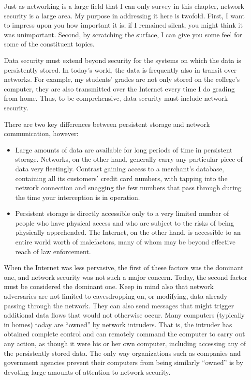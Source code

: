 Just as networking is a large field that I can only survey in this chapter, network
security is a large area.  My purpose in addressing it here is
twofold.  First, I want to impress upon you how important it is; if I
remained silent, you might think it was unimportant.  Second, by
scratching the surface, I can give you some feel for some of the
constituent topics.

Data security must extend beyond security for the systems on which
the data is persistently stored.  In today's world, the data is frequently also in transit
over networks.  For example, my students' grades are not only stored
on the college's computer, they are also transmitted over the Internet
every time I do grading from home.  Thus, to be comprehensive, data
security must include network security.

There are two key differences between persistent storage and network
communication, however:
\begin{itemize}
\item
Large amounts of data are available for long periods of time in
persistent storage.  Networks, on the other hand, generally carry any
particular piece of data very fleetingly.  Contrast gaining access to
a merchant's database, containing all its customers' credit card
numbers, with tapping into the network connection and snagging the few
numbers that pass through during the time your interception is in
operation.
\item
Persistent storage is directly accessible only to a very limited
number of people who have physical access and who are subject to the
risks of being physically apprehended.  The Internet, on the other
hand, is accessible to an entire world worth of malefactors, many of
whom may be beyond effective reach of law enforcement.
\end{itemize}

When the Internet was less pervasive, the first of these factors was
the dominant one, and network security was not such a major concern.
Today, the second factor must be considered the dominant one.  Keep in
mind also that network adversaries are not limited to eavesdropping on,
or modifying, data already passing through the network.  They can also
send messages that might trigger additional data flows that would not
otherwise occur.  Many computers (typically in homes) today are
``owned'' by network intruders.  That is, the intruder has obtained
complete control and can remotely command the computer to carry out
any action, as though it were his or her own computer, including
accessing any of the persistently stored data.  The only way
organizations such as companies and government agencies prevent their
computers from being similarly ``owned'' is by devoting large amounts
of attention to network security.

